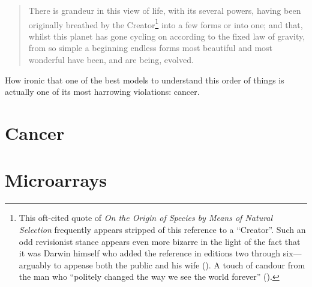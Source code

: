 \documentclass{tufte-book}
\begin{document}
\begin{quotation}
  There is grandeur in this view of life, with its several powers, having been
  originally breathed by the Creator\footnote{This \mbox{oft-cited} quote of
    \emph{On the Origin of Species by Means of Natural Selection} frequently
    appears stripped of this reference to a ``Creator''.  Such an odd
    revisionist stance appears even more bizarre in the light of the fact that
    it was Darwin himself who added the reference in editions two through
    six---arguably to appease both the public and his wife
    (\citealp{thompson_origin_2003}).  A touch of candour from the man who
    ``politely changed the way we see the world forever''
    (\citealp{rutherford_there_2008}).} into a few forms or into one; and that,
  whilst this planet has gone cycling on according to the fixed law of gravity,
  from so simple a beginning endless forms most beautiful and most wonderful
  have been, and are being, evolved.
\end{quotation}

How ironic that one of the best models to understand this order of things is
actually one of its most harrowing violations: cancer.\bigskip

\section{Cancer}

\bigskip

\section{Microarrays}

\backmatter



% 
% 
\end{document}
